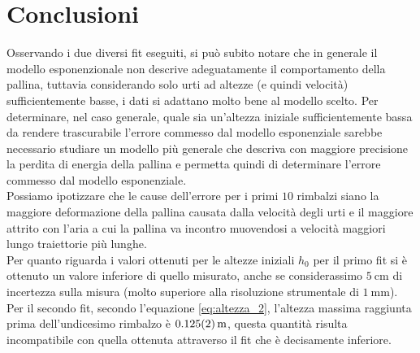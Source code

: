 \documentclass[a4paper]{article}
\begin{document}
    \section{Conclusioni}
    Osservando i due diversi fit eseguiti, si può subito notare che in generale il
    modello esponenzionale non descrive adeguatamente il comportamento della pallina,
    tuttavia considerando solo urti ad altezze (e quindi velocità) sufficientemente basse,
    i dati si adattano molto bene al modello scelto. Per determinare, nel caso generale,
    quale sia un'altezza iniziale sufficientemente bassa da rendere trascurabile l'errore
    commesso dal modello esponenziale sarebbe necessario studiare un modello più generale
    che descriva con maggiore precisione la perdita di energia della pallina e permetta
    quindi di determinare l'errore commesso dal modello esponenziale.\\
    Possiamo ipotizzare che le cause dell'errore per i primi $10$ rimbalzi siano la maggiore
    deformazione della pallina causata dalla velocità degli urti e il maggiore attrito
    con l'aria a cui la pallina va incontro muovendosi a velocità maggiori lungo
    traiettorie più lunghe.\\
    Per quanto riguarda i valori ottenuti per le altezze iniziali $h_0$ per il primo fit
    si è ottenuto un valore inferiore di quello misurato, anche se considerassimo
    $\SI{5}{\cm}$ di incertezza sulla misura (molto superiore alla risoluzione strumentale
    di $\SI{1}{\mm}$).
    Per il secondo fit, secondo l'equazione \ref{eq:altezza_2}, l'altezza massima raggiunta prima
    dell'undicesimo rimbalzo è $\SI{0.125\pm 0.002}{\meter}$, questa quantità
    risulta incompatibile con quella ottenuta attraverso il fit che è decisamente inferiore.
\end{document}
